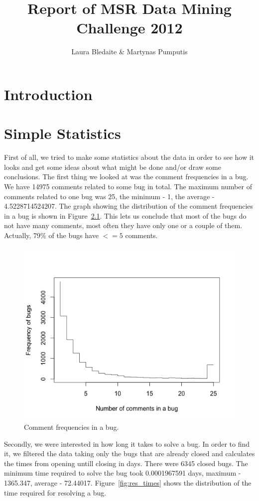 \documentclass[a4paper,11pt]{report}
\begin{document}
\title{Report of MSR Data Mining Challenge 2012}
\author{Laura Bledaite \& Martynas Pumputis}
\maketitle
\tableofcontents
\chapter{Introduction}
\chapter{Simple Statistics}
First of all, we tried to make some statistics about the data in order to see how it looks and get some ideas about what might be done and/or draw some conclusions.
The first thing we looked at was the comment frequencies in a bug. We have 14975 comments related to some bug in total. The maximum number of comments related to one bug was 25, the minimum - 1, the average - 4.5228714524207. The graph showing the distribution of the comment frequencies in a bug is shown in Figure~\ref{fig:com_freq}. This lets us conclude that most of the bugs do not have many comments, most often they have only one or a couple of them. Actually, 79\% of the bugs have $<=5$ comments.

\begin{figure}[ht!]
\centering
\includegraphics[width=.7\textwidth]{../diagrams/comment_frequencies.png}
\caption{Comment frequencies in a bug.}
\label{fig:com_freq}
\end{figure}

Secondly, we were interested in how long it takes to solve a bug. In order to find it, we filtered the data taking only the bugs that are already closed and calculates the times from opening untill closing in days. There were 6345 closed bugs. The minimum time required to solve the bug took 0.0001967591 days, maximum - 1365.347, average - 72.44017. Figure~\ref{fig:res_times} shows the distribution of the time required for resolving a bug.
\end{document}
